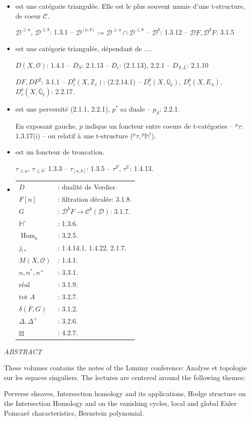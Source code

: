 \documentclass[12pt,a4paper]{article}
\theoremstyle{plain}
\theoremstyle{definition}
\theoremstyle{remark}
\DeclareMathOperator{\Hom}{Hom}
\newcommand{\HH}{\mathbb{H}}
\newcommand{\QQ}{\mathbb{Q}}
\newcommand{\ZZ}{\mathbb{Z}}
\newcommand{\cD}{\mathcal{D}}
\newcommand{\cO}{\mathcal{O}}
\begin{document}
\begin{itemize}
\item[$\cD$] est une cat\'egorie triangul\'ee. Elle est le plus souvent munie d'une t-structure, de coeur $\mathcal{C}$.

$\cD^{\geq a}$, $\cD^{\leq b}$: 1.3.1 -- $\cD^{[a,b]} := \cD^{\geq a} \cap \cD^{\leq b}$ -- $\cD^b$: 1.3.12 -- $\cD F, \cD^b F$: 3.1.5

\item[$\cD(\ldots)$] est une cat\'egorie triangul\'ee, d\'ependant de $\ldots$.

$D(X, \cO)$: 1.4.1 -- $D_S$: 2.1.13 -- $D_c$: (2.1.13), 2.2.1 -- $D_{S,L}$: 2.1.10

$DF, DF^2$: 3.1.1 -- $D^b_c(X, \ZZ_{\ell})$: (2.2.14.1) -- $D^b_c(X, \QQ_{\ell})$, $D^b_c(X, E_{\lambda})$, $D^b_c(X, \overline{\QQ}_{\ell})$: 2.2.17.

\item[$p$] est une perversit\'e (2.1.1, 2.2.1), $p^*$ sa duale -- $p_S$: 2.2.1.

En exposant gauche, $p$ indique un foncteur entre coeurs de t-cat\'egories -- ${}^{p}\tau$: 1.3.17(i) -- ou relatif \`a une t-structure (${}^{p}\tau, {}^{p}\HH^i$).

\item[$\tau$] est un foncteur de troncation.

$\tau_{\geq a}$, $\tau_{\leq b}$: 1.3.3 -- $\tau_{[a,b]}$: 1.3.5 -- $\tau^F$, $\tau^U$: 1.4.13.

\item[Notation diverses:]
\begin{tabular}{ll}
$D$ & : dualit\'e de Verdier. \\
$F[n]$ & : filtration d\'ecal\'ee: 3.1.8. \\
$G$ & : $\cD^b F \to \mathcal{C}^b(\cD)$: 3.1.7. \\
$\HH^\circ$ & : 1.3.6. \\
$\Hom_a$ & : 3.2.5. \\
$j_{!*}$ & : 1.4.14.1, 1.4.22, 2.1.7. \\
$M(X, \cO)$ & : 1.4.1. \\
$n, n^*, n^+$ & : 3.3.1. \\
$\text{r\'eal}$ & : 3.1.9. \\
$\text{tot } A$ & : 3.2.7. \\
$\delta(F, G)$ & : 3.1.2. \\
$\Delta, \Delta^+$ & : 3.2.6. \\
$\boxtimes$ & : 4.2.7.
\end{tabular}
\end{itemize}

\newpage
\begin{center}
\textit{ABSTRACT}
\end{center}

\vspace{1cm}

These volumes contains the notes of the Luminy conference: Analyse et topologie sur les espaces singuliers. The lectures are centered around the following themes:

Perverse sheaves, Intersection homology and its applications, Hodge structure on the Intersection Homology and on the vanishing cycles, local and global Euler Poincar\'e characteristics, Bernstein polynomial.
\end{document}
